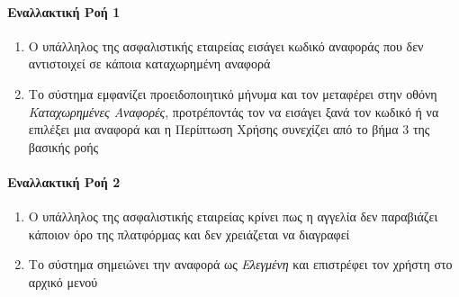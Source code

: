 \documentclass{../ol-softwaremanual}
\begin{document}
	\paragraph{Εναλλακτική Ροή 1}
	\begin{enumerate}
		\item Ο υπάλληλος της ασφαλιστικής εταιρείας εισάγει κωδικό αναφοράς που δεν αντιστοιχεί σε κάποια καταχωρημένη αναφορά
		\item Το σύστημα εμφανίζει προειδοποιητικό μήνυμα και τον μεταφέρει στην οθόνη \textit{Καταχωρημένες Αναφορές}, προτρέποντάς τον να εισάγει ξανά τον κωδικό ή να επιλέξει μια αναφορά και η Περίπτωση Χρήσης συνεχίζει από το βήμα 3 της βασικής ροής
	\end{enumerate}	
	
	\paragraph{Εναλλακτική Ροή 2}
		\begin{enumerate}
			\item Ο υπάλληλος της ασφαλιστικής εταιρείας κρίνει πως η αγγελία δεν παραβιάζει κάποιον όρο της πλατφόρμας και δεν χρειάζεται να διαγραφεί
			\item Το σύστημα σημειώνει την αναφορά ως \textit{Ελεγμένη}	και επιστρέφει τον χρήστη στο αρχικό μενού
	\end{enumerate}
	
\end{document}
